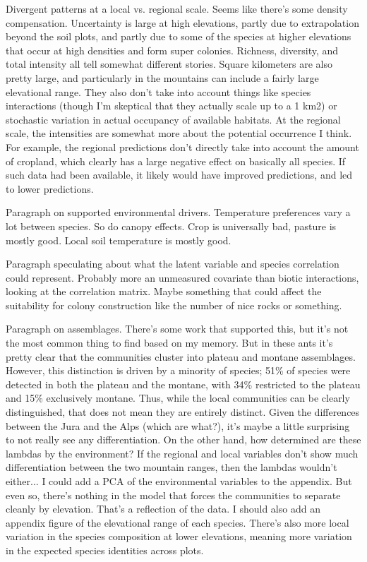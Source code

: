 \documentclass[preprint,review,times,12pt]{elsarticle}
\begin{document}
Divergent patterns at a local vs. regional scale. Seems like there's some density compensation. Uncertainty is large at high elevations, partly due to extrapolation beyond the soil plots, and partly due to some of the species at higher elevations that occur at high densities and form super colonies. Richness, diversity, and total intensity all tell somewhat different stories. Square kilometers are also pretty large, and particularly in the mountains can include a fairly large elevational range. They also don't take into account things like species interactions (though I'm skeptical that they actually scale up to a 1 km2) or stochastic variation in actual occupancy of available habitats. At the regional scale, the intensities are somewhat more about the potential occurrence I think. For example, the regional predictions don't directly take into account the amount of cropland, which clearly has a large negative effect on basically all species. If such data had been available, it likely would have improved predictions, and led to lower predictions.

Paragraph on supported environmental drivers. Temperature preferences vary a lot between species. So do canopy effects. Crop is universally bad, pasture is mostly good. Local soil temperature is mostly good. 

Paragraph speculating about what the latent variable and species correlation could represent. Probably more an unmeasured covariate than biotic interactions, looking at the correlation matrix. Maybe something that could affect the suitability for colony construction like the number of nice rocks or something.

Paragraph on assemblages. There's some work that supported this, but it's not the most common thing to find based on my memory. But in these ants it's pretty clear that the communities cluster into plateau and montane assemblages. However, this distinction is driven by a minority of species; 51\% of species were detected in both the plateau and the montane, with 34\% restricted to the plateau and 15\% exclusively montane. Thus, while the local communities can be clearly distinguished, that does not mean they are entirely distinct. Given the differences between the Jura and the Alps (which are what?), it's maybe a little surprising to not really see any differentiation. On the other hand, how determined are these lambdas by the environment? If the regional and local variables don't show much differentiation between the two mountain ranges, then the lambdas wouldn't either... I could add a PCA of the environmental variables to the appendix. But even so, there's nothing in the model that forces the communities to separate cleanly by elevation. That's a reflection of the data. I should also add an appendix figure of the elevational range of each species. There's also more local variation in the species composition at lower elevations, meaning more variation in the expected species identities across plots. 
\end{document}
